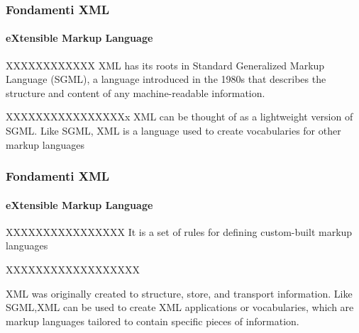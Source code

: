 


\begin{frame}
	\frametitle{Fondamenti XML}
	\framesubtitle{eXtensible Markup Language}
	\addtocounter{nframe}{1}

	\begin{block}{XXXXXXXXXXXX}
		XML has its roots in Standard Generalized Markup Language (SGML), a language
		introduced in the 1980s that describes the structure and content of any machine-readable information.
	\end{block}

	\begin{block} {XXXXXXXXXXXXXXXXx}
		XML can be
		thought of as a lightweight version of SGML. Like SGML, XML is a language used to create vocabularies for other markup languages

	\end{block}
\end{frame}

\begin{frame}
	\frametitle{Fondamenti XML}
	\framesubtitle{eXtensible Markup Language}
	\addtocounter{nframe}{1}

	\begin{block}{XXXXXXXXXXXXXXXX}
		It is a set of rules for defining custom-built markup languages
	\end{block}

	\begin{block} {XXXXXXXXXXXXXXXXXX}

		XML was originally created to structure, store, and transport information.
		Like SGML,XML can be used to create XML applications or vocabularies, which are markup
		languages tailored to contain specific pieces of information.

	\end{block}
\end{frame}


